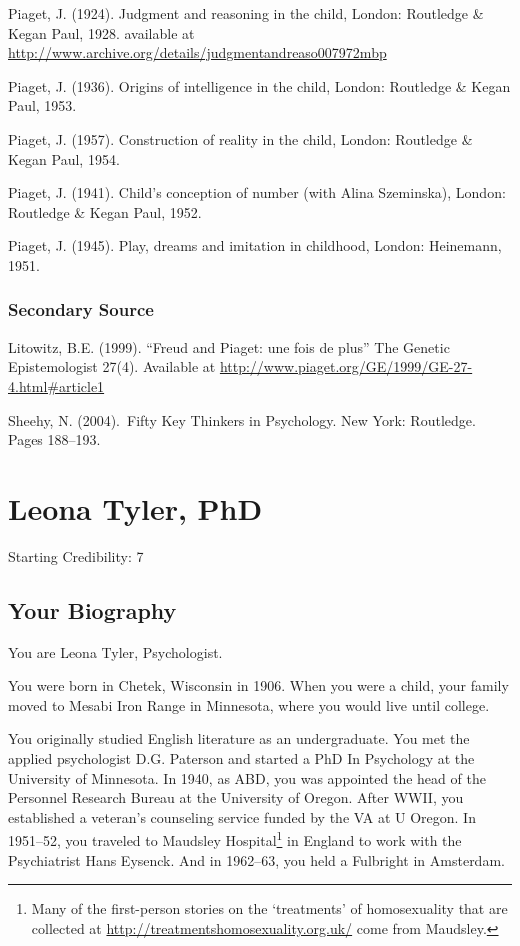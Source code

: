 \begin{refsection}
Piaget, J. (1924). Judgment and reasoning in the child, London: Routledge \& Kegan Paul, 1928. available at \url{http://www.archive.org/details/judgmentandreaso007972mbp}

Piaget, J. (1936). Origins of intelligence in the child, London: Routledge \& Kegan Paul, 1953.

Piaget, J. (1957). Construction of reality in the child, London: Routledge \& Kegan Paul, 1954.

Piaget, J. (1941). Child's conception of number (with Alina Szeminska), London: Routledge \& Kegan Paul, 1952.

Piaget, J. (1945). Play, dreams and imitation in childhood, London: Heinemann, 1951.

\subsection{Secondary Source}
\label{secondarysource}

Litowitz, B.E. (1999). “Freud and Piaget: une fois de plus” The Genetic Epistemologist 27(4). Available at \url{http://www.piaget.org/GE/1999/GE-27-4.html#article1}

Sheehy, N. (2004). Fifty Key Thinkers in Psychology. New York: Routledge. Pages 188--193.

\chapter{Leona Tyler, PhD}
\label{leonatylerphd}

Starting Credibility: 7

\section{Your Biography}
\label{yourbiography}

You are Leona Tyler, Psychologist.

You were born in Chetek, Wisconsin in 1906. When you were a child, your family moved to Mesabi Iron Range in Minnesota, where you would live until college.

You originally studied English literature as an undergraduate. You met the applied psychologist D.G. Paterson and started a PhD In Psychology at the University of Minnesota. In 1940, as ABD, you was appointed the head of the Personnel Research Bureau at the University of Oregon. After WWII, you established a veteran’s counseling service funded by the VA at U Oregon. In 1951--52, you traveled to Maudsley Hospital\footnote{Many of the first-person stories on the `treatments' of homosexuality that are collected at \url{http://treatmentshomosexuality.org.uk/} come from Maudsley.} in England to work with the Psychiatrist Hans Eysenck. And in 1962--63, you held a Fulbright in Amsterdam.


\end{refsection}
